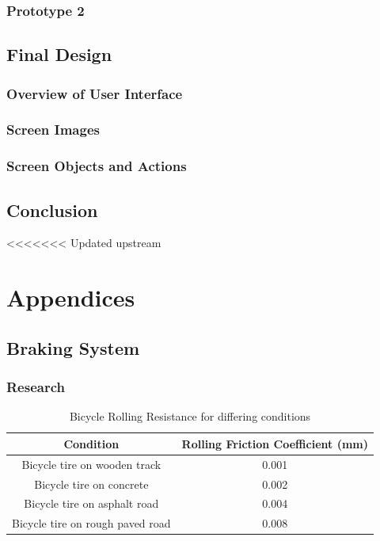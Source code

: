 \documentclass[a4paper]{report}
\begin{document}
\section{Prototype 2}

\chapter{Final Design}
\section{Overview of User Interface}
\section{Screen Images}
\section{Screen Objects and Actions}

\chapter{Conclusion}
<<<<<<< Updated upstream

\part*{Appendices}

  


 
\appendix
\chapter{Braking System}
\section{Research}

\begin{table}[h]

    \begin{tabular}{ | c | c |}
    \hline
    \textbf{Condition} & \textbf{Rolling Friction Coefficient (mm)} \\ \hline
   
   Bicycle tire on wooden track & 0.001   \\ \hline
   Bicycle tire on concrete & 0.002 \\ \hline
  Bicycle tire on asphalt road & 0.004 \\ \hline
  Bicycle tire on rough paved road & 0.008 \\ \hline

  \end{tabular}

\caption[Table caption text]{Bicycle Rolling Resistance for differing conditions \cite{cite:bicycle_friction}} 
\label{table:bicycle_friction}
\end{table}
\end{document}
